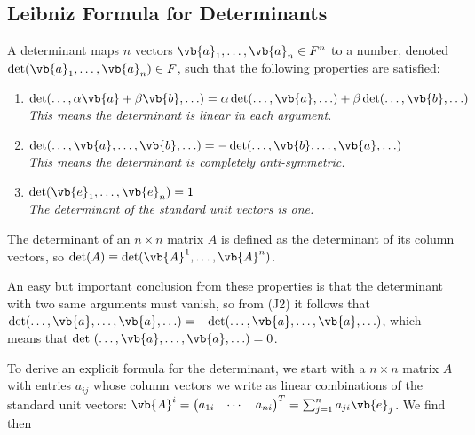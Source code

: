 \documentclass[a4paper,12pt]{report}
\begin{document}
\subsection{Leibniz Formula for Determinants}

\begin{definition}
    A determinant maps \( n \) vectors \(\vb{a}_1, \ldots, \vb{a}_n \in F^n\) to a number, denoted \(\det(\vb{a}_1, \ldots, \vb{a}_n) \in F\), such that the following properties are satisfied:
    \begin{enumerate}[label=(\(J\)\arabic*)]
        \item \(\det(\ldots, \alpha \vb{a} + \beta \vb{b}, \ldots) = \alpha \det(\ldots, \vb{a}, \ldots) + \beta \det(\ldots, \vb{b}, \ldots)\)\\
        \textit{This means the determinant is linear in each argument.}
        
        \item \(\det(\ldots, \vb{a}, \ldots, \vb{b}, \ldots) = -\det(\ldots, \vb{b}, \ldots, \vb{a}, \ldots)\)\\
        \textit{This means the determinant is completely anti-symmetric.}
        
        \item \(\det(\vb{e}_1, \ldots, \vb{e}_n) = 1\)\\
        \textit{The determinant of the standard unit vectors is one.}
    \end{enumerate}
    The determinant of an \( n \times n \) matrix \( A \) is defined as the determinant of its column vectors, so \(\det(A) \equiv  \det(\vb{A}^1, \ldots, \vb{A}^n)\).
\end{definition}

An easy but important conclusion from these properties is that the determinant with two same arguments must vanish, so from (J2) it follows that \(\text{det}(\ldots , \vb{a} , \ldots , \vb{a} , \ldots ) = - \text{det}(\ldots ,\vb{a} ,\ldots ,\vb{a} ,\ldots )  \), which means that \(\text{det }(\ldots , \vb{a} ,\ldots ,\vb{a} ,\ldots ) = 0  \). 

To derive an explicit formula for the determinant, we start with a \(n \times n\) matrix \(A\) with entries \(a_{ij} \) whose column vectors we write as linear combinations of the standard unit vectors: \(\vb{A} ^{i} = \begin{pmatrix}
         a_{1i}  &
         \cdots  &
         a_{ni} 
    \end{pmatrix}^T = \sum_{j=1}^{n} a_{ji} \vb{e} _{j}\). We find then
\end{document}
